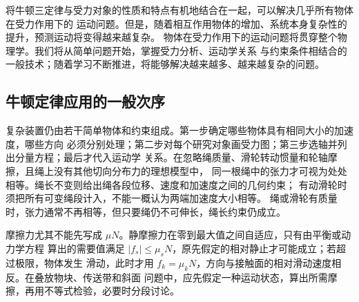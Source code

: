 {\newcommand{\soldiagTwoTwentyThree}{%
\begin{center}\begin{minipage}{\linewidth}\centering\begin{tikzpicture}[scale=.95]
 \node[solpanel] at (-2.2,2) {杆的受力};
 \fill (-2.2,0) circle(2pt);
 \draw[solforce] (-2.2,0)--++(65:1.4) node[above,sollabel] {$N$};
 \draw[solforce] (-2.2,0)--++(0,-1.4) node[below,sollabel] {$mg$};
 \draw[solforce] (-2.2,0)--++(-1.2,0) node[left,sollabel] {$R_h$};
 \draw[solgeom,->] (-1.1,-.4)--(-1.1,.7) node[right,sollabel] {$a\tan\theta$};
 \node[solpanel] at (2.5,2) {斜面的水平受力};
 \fill (2.5,0) circle(2pt);
 \draw[solforce] (2.5,0)--++(-1.4,0) node[left,sollabel] {$N\sin\theta$};
 \draw[solforce] (2.5,0)--++(1.4,0) node[right,sollabel] {$F$};
 \draw[solgeom,->] (2,-.8)--(3.1,-.8) node[right,sollabel] {$a$};
\end{tikzpicture}\diagcaption{解图}{左图保留固定导轨的水平约束力 $R_h$；右图只列斜面的水平力分量，二者的加速度方向不同。}\label{mech:legacy:ch06:s05-2-23}\end{minipage}\end{center}}


将牛顿三定律与受力对象的性质和特点有机地结合在一起，可以解决几乎所有物体在受力作用下的
运动问题。但是，随着相互作用物体的增加、系统本身复杂性的提升，预测运动将变得越来越复杂。
物体在受力作用下的运动问题将贯穿整个物理学。我们将从简单问题开始，掌握受力分析、运动学关系
与约束条件相结合的一般技术；随着学习不断推进，将能够解决越来越多、越来越复杂的问题。

\subsection{牛顿定律应用的一般次序}

复杂装置仍由若干简单物体和约束组成。第一步确定哪些物体具有相同大小的加速度，哪些方向
必须分别处理；第二步对每个研究对象画受力图；第三步选轴并列出分量方程；最后才代入运动学
关系。在忽略绳质量、滑轮转动惯量和轮轴摩擦，且绳上没有其他切向分布力的理想模型中，
同一根绳中的张力才可视为处处相等。绳长不变则给出绳各段位移、速度和加速度之间的几何约束；
有动滑轮时须把所有可变绳段计入，不能一概认为两端加速度大小相等。
绳或滑轮有质量时，张力通常不再相等，但只要绳仍不可伸长，绳长约束仍成立。

摩擦力尤其不能先写成 $\mu N$。静摩擦力在零到最大值之间自适应，只有由平衡或动力学方程
算出的需要值满足 $|f_s|\leq\mu_sN$，原先假定的相对静止才可能成立；若超过极限，物体发生
滑动，此时才用 $f_k=\mu_kN$，方向与接触面的相对滑动速度相反。在叠放物块、传送带和斜面
问题中，应先假定一种运动状态，算出所需摩擦，再用不等式检验，必要时分段讨论。

}
